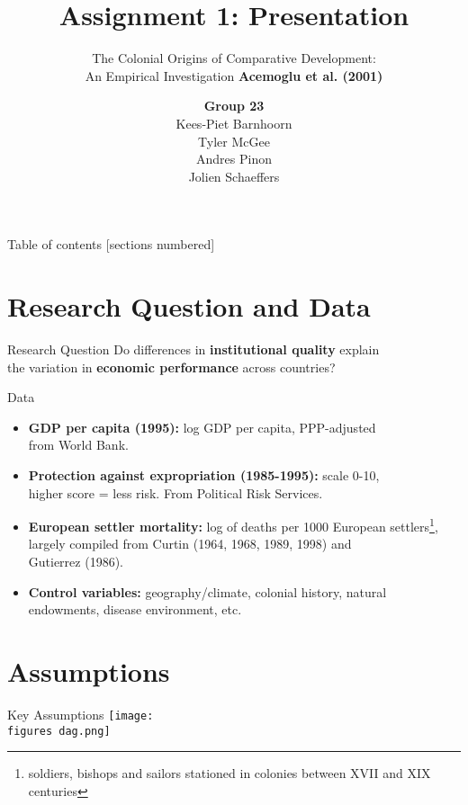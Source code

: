 \documentclass[10pt]{beamer}
\title{Assignment 1: Presentation}
\subtitle{The Colonial Origins of Comparative Development:\\An Empirical Investigation \textbf{Acemoglu et al. (2001)}}
\date{}
\author{\textbf{Group 23}\\Kees-Piet Barnhoorn\\Tyler McGee\\Andres Pinon\\Jolien Schaeffers}
\institute{FEM11087 Applied Microeconometrics}
\newcommand{\figures}{figures/}
\begin{document}
\maketitle

\begin{frame}{Table of contents}
  [sections numbered]
  \tableofcontents%
\end{frame}

\section{Research Question and Data}

\begin{frame}{Research Question}
  \Large{Do differences in \textbf{institutional quality} explain\\the variation in \textbf{economic performance} across countries?}
\end{frame}

\begin{frame}{Data}
  \begin{itemize}
    \item \textbf{GDP per capita (1995):} log GDP per capita, PPP-adjusted\\from World Bank.
    \item \textbf{Protection against expropriation (1985-1995):} scale 0-10,\\higher score = less risk. From Political Risk Services.
    \item \textbf{European settler mortality:} log of deaths per 1000 European settlers\footnote{soldiers, bishops and sailors stationed in colonies between XVII and XIX centuries}, largely compiled from Curtin (1964, 1968, 1989, 1998) and\\Gutierrez (1986).
    \item \textbf{Control variables:} geography/climate, colonial history, natural endowments, disease environment, etc.
  \end{itemize}
\end{frame}

\section{Assumptions}

\begin{frame}{Key Assumptions}
  \centering
  \texttt{[image: \\figures dag.png]}
\end{frame}
\end{document}
